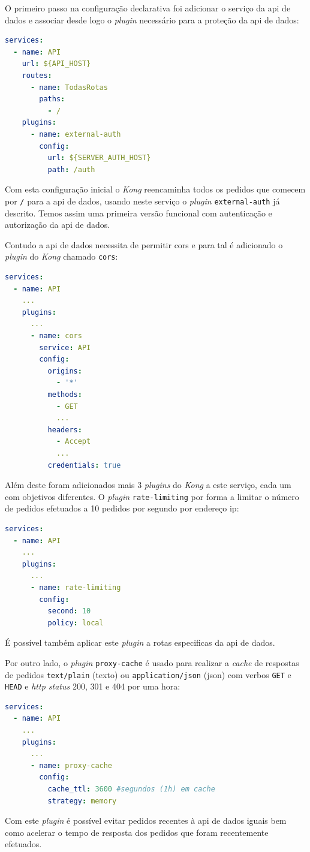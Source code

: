 O primeiro passo na configuração declarativa foi adicionar o serviço da \acrshort{api} de dados e associar desde logo o \textit{plugin} necessário para a proteção da \acrshort{api} de dados:
\begin{lstlisting}[language=yaml, caption=Configuração declarativa do \textit{Kong}: \acrshort{api} de dados]
services:
  - name: API
    url: ${API_HOST}
    routes:
      - name: TodasRotas
        paths:
          - /
    plugins:
      - name: external-auth
        config:
          url: ${SERVER_AUTH_HOST}
          path: /auth
\end{lstlisting}
Com esta configuração inicial o \textit{Kong} reencaminha todos os pedidos que comecem por \texttt{/} para a \acrshort{api} de dados, usando neste serviço o \textit{plugin} \texttt{external-auth} já descrito. Temos assim uma primeira versão funcional com autenticação e autorização da \acrshort{api} de dados.

Contudo a \acrshort{api} de dados necessita de permitir \acrshort{cors} e para tal é adicionado o \textit{plugin} do \textit{Kong} chamado \texttt{cors}\cite{kongCORS}:
\begin{lstlisting}[language=yaml, caption=Configuração declarativa do \textit{Kong}: \textit{plugin} \texttt{cors}]
services:
  - name: API
    ...
    plugins:
      ...
      - name: cors
        service: API
        config:
          origins:
            - '*'
          methods:
            - GET
            ...
          headers:
            - Accept
            ...
          credentials: true
\end{lstlisting}
Além deste foram adicionados mais 3 \textit{plugins} do \textit{Kong} a este serviço, cada um com objetivos diferentes. O \textit{plugin} \texttt{rate-limiting} por forma a limitar o número de pedidos efetuados a 10 pedidos por segundo por endereço \acrshort{ip}\cite{kongRateLimiting}:
\begin{lstlisting}[language=yaml, caption=Configuração declarativa do \textit{Kong}: \textit{plugin} \texttt{rate-limiting}]
services:
  - name: API
    ...
    plugins:
      ...
      - name: rate-limiting
        config:
          second: 10
          policy: local
\end{lstlisting}
É possível também aplicar este \textit{plugin} a rotas especificas da \acrshort{api} de dados.

Por outro lado, o \textit{plugin} \texttt{proxy-cache} é usado para realizar a \textit{cache} de respostas de pedidos \texttt{text/plain} (texto) ou \texttt{application/json} (\acrshort{json}) com verbos \texttt{GET} e \texttt{HEAD} e \textit{\acrshort{http} status} 200, 301 e 404 por uma hora\cite{kongProxyCache}:
\begin{lstlisting}[language=yaml, caption=Configuração declarativa do \textit{Kong}: \textit{plugin} \texttt{proxy-cache}]
services:
  - name: API
    ...
    plugins:
      ...
      - name: proxy-cache
        config:
          cache_ttl: 3600 #segundos (1h) em cache
          strategy: memory
\end{lstlisting}
Com este \textit{plugin} é possível evitar pedidos recentes à \acrshort{api} de dados iguais bem como acelerar o tempo de resposta dos pedidos que foram recentemente efetuados.

